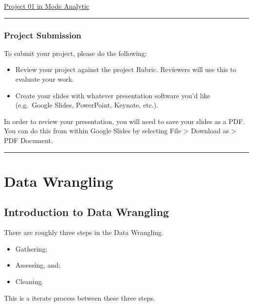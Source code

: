\documentclass[]{book}
\providecommand{\tightlist}{%
  \setlength{\itemsep}{0pt}\setlength{\parskip}{0pt}}
\begin{document}
\href{https://modeanalytics.com/ah_uyekita/reports/e77643786160}{Project
01 in Mode Analytic}

\begin{center}\rule{0.5\linewidth}{\linethickness}\end{center}

\subsection{Project Submission}\label{project-submission}

To submit your project, please do the following:

\begin{itemize}
\tightlist
\item
  Review your project against the project Rubric. Reviewers will use
  this to evaluate your work.
\item
  Create your slides with whatever presentation software you'd like
  (e.g.~Google Slides, PowerPoint, Keynote, etc.).
\end{itemize}

In order to review your presentation, you will need to save your slides
as a PDF. You can do this from within Google Slides by selecting File
\textgreater{} Download as \textgreater{} PDF Document.

\begin{center}\rule{0.5\linewidth}{\linethickness}\end{center}

\chapter{Data Wrangling}\label{data-wrangling}

\section{Introduction to Data
Wrangling}\label{introduction-to-data-wrangling}

There are roughly three steps in the Data Wrangling.

\begin{itemize}
\tightlist
\item
  Gathering;
\item
  Assessing, and;
\item
  Cleaning.
\end{itemize}

This is a iterate process between these three steps.
\end{document}
